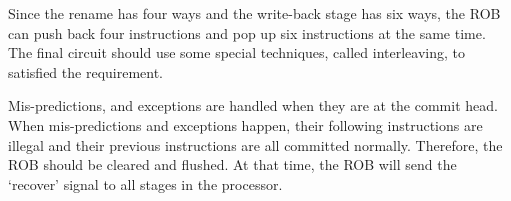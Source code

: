 Since the rename has four ways and the write-back stage has six ways, the ROB can push back four instructions and pop up six instructions at the same time. The final circuit should use some special techniques, called interleaving, to satisfied the requirement.

Mis-predictions, and exceptions are handled when they are at the commit head. When mis-predictions and exceptions happen, their following instructions are illegal and their previous instructions are all committed normally. Therefore, the ROB should be cleared and flushed. At that time, the ROB will send the `recover' signal to all stages in the processor.

